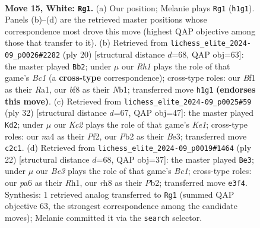 \documentclass[11pt]{article}
\begin{document}
\clearpage

\begin{figure}[p]\centering
\begin{subfigure}{0.46\textwidth}\centering
\resizebox{\linewidth}{!}{%
\newchessgame
\chessboard[
  setfen={1r2kb1r/1p1b1ppp/p1n1p3/4P3/n7/4BNP1/PPK2P1P/RN3B1R w k - 6 15},
  showmover=false,
  pgfstyle=straightmove, color=movearrow, markmove={h1-g1}
]}
\caption{}
\end{subfigure}\hfill
\begin{subfigure}{0.46\textwidth}\centering
\resizebox{\linewidth}{!}{%
\newchessgame
\chessboard[
  setfen={r1b1k2r/1p2bppp/p1n1pn2/8/1PB5/P3PN2/5PPP/RNBR2K1 w kq - 1 11},
  showmover=false,
  pgfstyle=straightmove, color=movearrow, markmove={c1-b2}
]}
\caption{}
\end{subfigure}
\\[4pt]
\begin{subfigure}{0.46\textwidth}\centering
\resizebox{\linewidth}{!}{%
\newchessgame
\chessboard[
  setfen={r1b1r1k1/pp3ppp/2p1nb2/3p4/3P4/2PBB3/PP2NPPP/R3K2R w KQ - 1 17},
  showmover=false,
  pgfstyle=straightmove, color=movearrow, markmove={e1-d2}
]}
\caption{}
\end{subfigure}\hfill
\begin{subfigure}{0.46\textwidth}\centering
\resizebox{\linewidth}{!}{%
\newchessgame
\chessboard[
  setfen={2kr1bnr/1pp2ppp/p7/3P1b2/P1B5/2N5/1P3PPP/R1B1K2R w KQ - 1 12},
  showmover=false,
  pgfstyle=straightmove, color=movearrow, markmove={c1-e3}
]}
\caption{}
\end{subfigure}
\caption{\textbf{Move 15, White: \texttt{Rg1}.} (a) Our position; Melanie plays \texttt{Rg1} (\texttt{h1g1}). Panels (b)--(d) are the retrieved master positions whose correspondence most drove this move (highest QAP objective among those that transfer to it). (b) Retrieved from \texttt{lichess\_elite\_2024-09\_p0026\#2282} (ply 20) [structural distance $d$=68, QAP obj=63]: the master played \texttt{Bb2}; under $\mu$ our \emph{Rh1} plays the role of that game's \emph{Bc1} (a \textbf{cross-type} correspondence); cross-type roles: our \emph{B}f1 as their \emph{R}a1, our \emph{b}f8 as their \emph{N}b1; transferred move \texttt{h1g1} \textbf{(endorses this move)}. (c) Retrieved from \texttt{lichess\_elite\_2024-09\_p0025\#59} (ply 32) [structural distance $d$=67, QAP obj=47]: the master played \texttt{Kd2}; under $\mu$ our \emph{Kc2} plays the role of that game's \emph{Ke1}; cross-type roles: our \emph{n}a4 as their \emph{P}f2, our \emph{P}b2 as their \emph{B}e3; transferred move \texttt{c2c1}. (d) Retrieved from \texttt{lichess\_elite\_2024-09\_p0019\#1464} (ply 22) [structural distance $d$=68, QAP obj=37]: the master played \texttt{Be3}; under $\mu$ our \emph{Be3} plays the role of that game's \emph{Bc1}; cross-type roles: our \emph{p}a6 as their \emph{R}h1, our \emph{r}h8 as their \emph{P}b2; transferred move \texttt{e3f4}. Synthesis: 1 retrieved analog transferred to \texttt{Rg1} (summed QAP objective 63, the strongest correspondence among the candidate moves); Melanie committed it via the \texttt{search} selector.}
\label{fig:thought-m28}
\end{figure}
\end{document}
